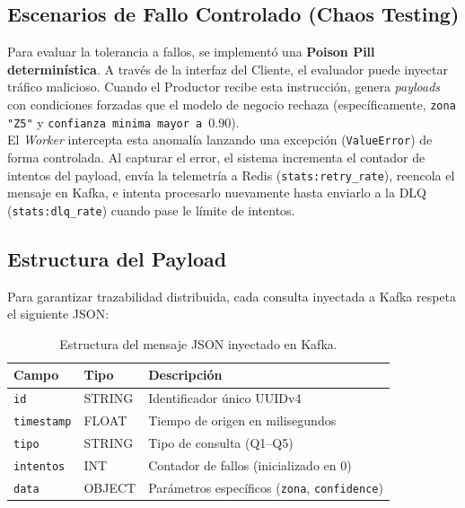 \documentclass[letter,12pt]{article}
\begin{document}
\subsection{Escenarios de Fallo Controlado (Chaos Testing)}

Para evaluar la tolerancia a fallos, se implementó una \textbf{Poison Pill determinística}. A través de la interfaz del Cliente, el evaluador puede inyectar tráfico malicioso. Cuando el Productor recibe esta instrucción, genera \textit{payloads} con condiciones forzadas que el modelo de negocio rechaza (específicamente, \texttt{zona "Z5"} y \texttt{confianza minima mayor a $0.90$}). 
\\
El \textit{Worker} intercepta esta anomalía lanzando una excepción (\texttt{ValueError}) de forma controlada. Al capturar el error, el sistema incrementa el contador de intentos del payload, envía la telemetría a Redis (\texttt{stats:retry\_rate}), reencola el mensaje en Kafka, e intenta procesarlo nuevamente hasta enviarlo a la DLQ (\texttt{stats:dlq\_rate}) cuando pase le límite de intentos.

\subsection{Estructura del Payload}

Para garantizar trazabilidad distribuida, cada consulta inyectada a Kafka respeta el siguiente JSON:

\begin{table}[H]
\centering
\begin{tabular}{lll}
\toprule
\textbf{Campo} & \textbf{Tipo} & \textbf{Descripción} \\
\midrule
\texttt{id}               & STRING & Identificador único UUIDv4 \\
\texttt{timestamp}        & FLOAT  & Tiempo de origen en milisegundos \\
\texttt{tipo}             & STRING & Tipo de consulta (Q1--Q5) \\
\texttt{intentos}         & INT    & Contador de fallos (inicializado en 0) \\
\texttt{data}             & OBJECT & Parámetros específicos (\texttt{zona}, \texttt{confidence}) \\
\bottomrule
\end{tabular}
\caption{Estructura del mensaje JSON inyectado en Kafka.}
\end{table}

\end{document}
